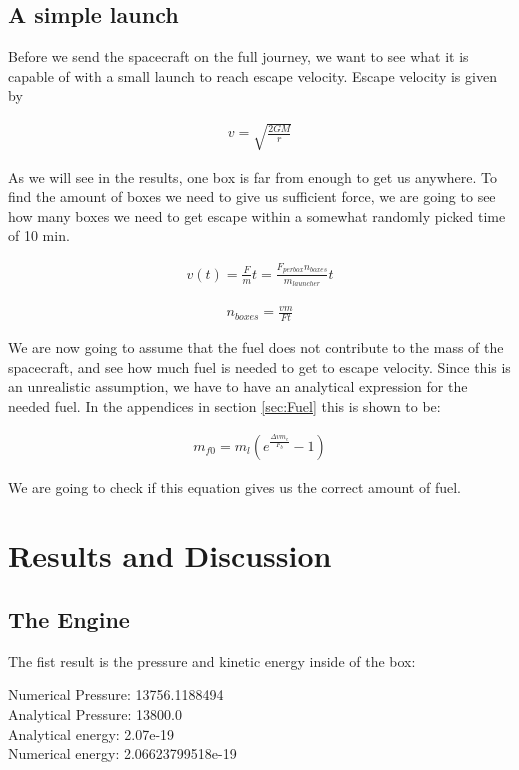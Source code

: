 \documentclass[a4paper, 10pt]{article}
\begin{document}
\subsection{A simple launch}

Before we send the spacecraft on the full journey, we want to see what it is capable of with a small launch to reach escape velocity. Escape velocity is given by 

\begin{align}\label{eq:escape}
v = \sqrt{\frac{2GM}{r}}
\end{align}

As we will see in the results, one box is far from enough to get us anywhere. To find the amount of boxes we need to give us sufficient force, we are going to see how many boxes we need to get escape within a somewhat randomly picked time of 10 min.

\begin{align}
v(t) = \frac{F}{m} t = \frac{F_{per box}n_{boxes}}{m_{launcher}} t
\end{align}

\begin{align}\label{eq:boxes}
n_{boxes} = \frac{v m}{F t}
\end{align}

We are now going to assume that the fuel does not contribute to the mass of the spacecraft, and see how much fuel is needed to get to escape velocity. Since this is an unrealistic assumption, we have to have an analytical expression for the needed fuel. In the appendices in section \ref{sec:Fuel} this is shown to be:

\begin{align}\label{eq:Fuel}
m_{f0} = m_l(e^{\frac{\Delta v m_e}{F_b}} - 1)
\end{align}

We are going to check if this equation gives us the correct amount of fuel.



\section{Results and Discussion}

\subsection{The Engine}

The fist result is the pressure and kinetic energy inside of the box:
\begin{tcolorbox}
Numerical Pressure:  13756.1188494 \\
Analytical Pressure:  13800.0 \\
Analytical energy:  2.07e-19 \\
Numerical energy:  2.06623799518e-19 
\end{tcolorbox}
\end{document}
